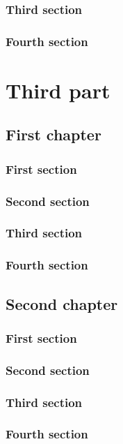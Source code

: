 \documentclass{researchbook}
\begin{document}
\section{Third section}\lipsum
\section{Fourth section}\lipsum


\part{Third part}
\chapter{First chapter}

\section{First section}\lipsum
\section{Second section}\lipsum
\section{Third section}\lipsum
\section{Fourth section}\lipsum


\chapter{Second chapter}

\section{First section}\lipsum
\section{Second section}\lipsum
\section{Third section}\lipsum
\section{Fourth section}\lipsum
\end{document}
